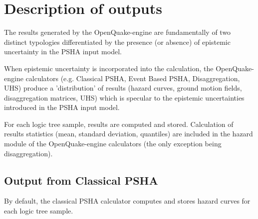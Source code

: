 \section{Description of outputs}
The results generated by the OpenQuake-engine are fundamentally 
of two distinct typologies differentiated by the presence (or 
absence) of epistemic uncertainty in the PSHA input model.

When epistemic uncertainty is incorporated into the 
calculation, the Open\-Quake\--engine calculators (e.g. Classical 
PSHA, Event Based PSHA, Disaggregation, UHS) produce a 
'distribution' of results (hazard curves, ground motion fields, 
disaggregation matrices, UHS) which is specular to the epistemic 
uncertainties introduced in the PSHA input model.

For each logic tree sample, results are computed and stored. 
Calculation of results statistics (mean, standard deviation, 
quantiles) are included in the hazard module of the 
OpenQuake-engine calculators (the only exception being 
disaggregation).
\subsection{Output from Classical PSHA}
By default, the classical PSHA calculator computes and stores 
hazard curves for each logic tree sample.

